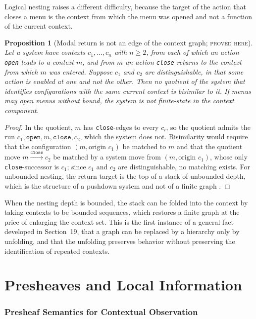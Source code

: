 \documentclass[11pt]{article}
\newtheorem{proposition}[theorem]{Proposition}
\theoremstyle{definition}
\theoremstyle{remark}
\newcommand{\stN}{\textsc{proved here}}
\begin{document}
Logical nesting raises a different difficulty, because the target of the action that closes a menu is the context from which the menu was opened and not a function of the current context.

\begin{proposition}[Modal return is not an edge of the context graph; \stN]\label{prop:modal}
Let a system have contexts $c_1,\dots,c_n$ with $n\ge2$, from each of which an action \texttt{open} leads to a context $m$, and from $m$ an action \texttt{close} returns to the context from which $m$ was entered. Suppose $c_1$ and $c_2$ are distinguishable, in that some action is enabled at one and not the other. Then no quotient of the system that identifies configurations with the same current context is bisimilar to it. If menus may open menus without bound, the system is not finite-state in the context component.
\end{proposition}
\begin{proof}
In the quotient, $m$ has \texttt{close}-edges to every $c_i$, so the quotient admits the run $c_1,\texttt{open},m,\texttt{close},c_2$, which the system does not. Bisimilarity would require that the configuration $(m,\text{origin }c_1)$ be matched to $m$ and that the quotient move $m\xrightarrow{\texttt{close}}c_2$ be matched by a system move from $(m,\text{origin }c_1)$, whose only \texttt{close}-successor is $c_1$; since $c_1$ and $c_2$ are distinguishable, no matching exists. For unbounded nesting, the return target is the top of a stack of unbounded depth, which is the structure of a pushdown system and not of a finite graph \cite{vpa}.
\end{proof}

When the nesting depth is bounded, the stack can be folded into the context by taking contexts to be bounded sequences, which restores a finite graph at the price of enlarging the context set. This is the first instance of a general fact developed in Section~19, that a graph can be replaced by a hierarchy only by unfolding, and that the unfolding preserves behavior without preserving the identification of repeated contexts.
\part{Presheaves and Local Information}

\section{Presheaf Semantics for Contextual Observation}
\end{document}
